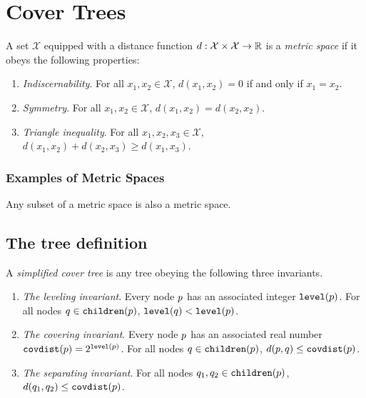 \documentclass[../main.tex]{subfiles}
\newcommand{\set}[1]{\mathcal {#1}}
\newcommand{\dist}[2]{\distf({#1},{#2})}
\newcommand{\distf}{d}
\newcommand{\p}{\ensuremath p}
\newcommand{\q}{\ensuremath q}
\newcommand{\level}[1]{\ensuremath{\textup{\text{\ttfamily level}({#1})}}}
\newcommand{\children}[1]{\ensuremath{\textup{\text{\ttfamily children}({#1})}}}
\newcommand{\covdist}[1]{\ensuremath{\textup{\text{\ttfamily covdist}({#1})}}}
\begin{document}
\chapter{Cover Trees}

\begin{definition}
    A set $\set X$ equipped with a distance function $\distf : \set X \times \set X \to \R$ is a \emph{metric space} if it obeys the following properties:
    \begin{enumerate}
        \item \emph{Indiscernability}.  For all $x_1,x_2\in\set X$, $\dist{x_1}{x_2} = 0$ if and only if $x_1=x_2$.
        \item \emph{Symmetry}. For all $x_1,x_2\in\set X$, $\dist{x_1}{x_2} = \dist{x_2}{x_2}$.
        \item \emph{Triangle inequality}.  For all $x_1,x_2,x_3\in\set X$, $\dist{x_1}{x_2} + \dist{x_2}{x_3}\ge\dist{x_1}{x_3}$.
    \end{enumerate}
\end{definition}

\subsection{Examples of Metric Spaces}

\begin{example}
    Any subset of a metric space is also a metric space.
\end{example}


\section{The tree definition}

\begin{definition}
    A \emph{simplified cover tree} is any tree obeying the following three invariants.
    \begin{enumerate}
        \item \emph{The leveling invariant}.
        Every node $\p$ has an associated integer $\level\p$.
        For all nodes $\q\in\children\p$, $\level\q < \level\p$.
        \item \emph{The covering invariant}.
        Every node $\p$ has an associated real number $\covdist\p=2^{\level\p}$.
        For all nodes $\q\in\children\p$, $\dist \p \q \le \covdist\p$.
        \item \emph{The separating invariant}.
        For all nodes $\q_1,\q_2\in\children\p$, $\dist {\q_1} {\q_2} \le \covdist\p$.
    \end{enumerate}
\end{definition}
\end{document}

